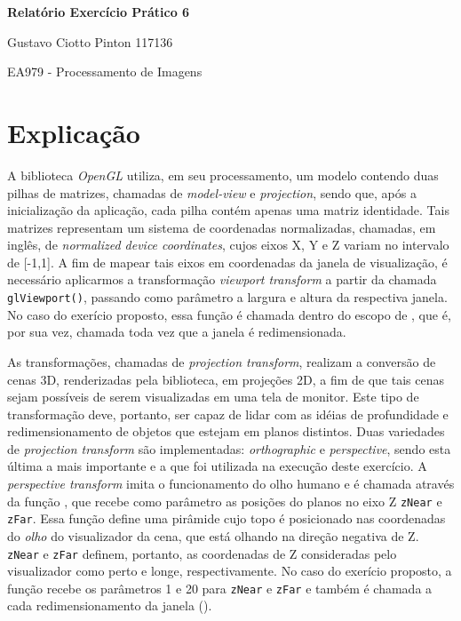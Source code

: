 \documentclass[12pt, a4paper]{article}
\begin{document}
    {\large
    \centerline{\textbf{Relatório Exercício Prático 6}}
    \centerline{Gustavo Ciotto Pinton 117136}
    \centerline{EA979 - Processamento de Imagens}
    }

\section {Explicação}

A biblioteca \textit{OpenGL} utiliza, em seu processamento, um modelo contendo
duas pilhas de matrizes, chamadas de \textit{model-view} e \textit{projection},
sendo que, após a inicialização da aplicação, cada pilha contém apenas uma
matriz identidade. Tais matrizes representam um sistema de coordenadas
normalizadas, chamadas, em inglês, de \textit{normalized device coordinates},
cujos eixos X, Y e Z variam no intervalo de [-1,1]. A fim de mapear tais
eixos em coordenadas da janela de visualização, é necessário aplicarmos a
transformação \textit{viewport transform} a partir da chamada
\texttt{glViewport()}, passando como parâmetro a largura e altura da respectiva
janela. No caso do exerício proposto, essa função é chamada dentro do escopo de
, que é, por sua vez, chamada toda vez que a janela é
redimensionada.  

\vspace{12pt}

As transformações, chamadas de \textit{projection transform}, realizam a
conversão de cenas 3D, renderizadas pela biblioteca, em projeções 2D, a fim de
que tais cenas sejam possíveis de serem visualizadas em uma tela de monitor.
Este tipo de transformação deve, portanto, ser capaz de lidar com as idéias de
profundidade e redimensionamento de objetos que estejam em planos distintos.
Duas variedades de \textit{projection transform} são implementadas:
\textit{orthographic} e \textit{perspective}, sendo esta última a mais
importante e a que foi utilizada na execução deste exercício. A
\textit{perspective transform} imita o funcionamento do olho humano e é chamada através da função
, que recebe como parâmetro as posições do planos no eixo Z
\texttt{zNear} e \texttt{zFar}. Essa função define uma pirâmide cujo topo é
posicionado nas coordenadas do \textit{olho} do visualizador da cena, que está
olhando na direção negativa de Z. \texttt{zNear} e \texttt{zFar} definem,
portanto, as coordenadas de Z consideradas pelo visualizador como perto e longe,
respectivamente. No caso do exerício proposto, a função  recebe os
parâmetros 1 e 20 para \texttt{zNear} e \texttt{zFar} e também é chamada a cada
redimensionamento da janela ().
\end{document}
